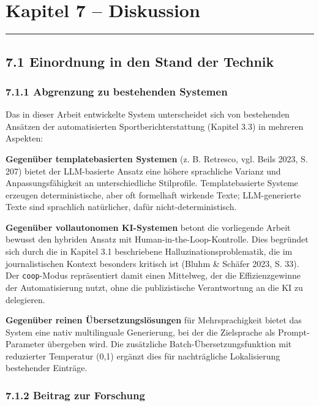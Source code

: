 \section{Kapitel 7 -- Diskussion}\label{kapitel-7-diskussion}

\begin{center}\rule{0.5\linewidth}{0.5pt}\end{center}

\subsection{7.1 Einordnung in den Stand der
Technik}\label{einordnung-in-den-stand-der-technik}

\subsubsection{7.1.1 Abgrenzung zu bestehenden
Systemen}\label{abgrenzung-zu-bestehenden-systemen}

Das in dieser Arbeit entwickelte System unterscheidet sich von
bestehenden Ansätzen der automatisierten Sportberichterstattung (Kapitel
3.3) in mehreren Aspekten:

\textbf{Gegenüber templatebasierten Systemen} (z. B. Retresco, vgl.
Beils 2023, S. 207) bietet der LLM-basierte Ansatz eine höhere
sprachliche Varianz und Anpassungsfähigkeit an unterschiedliche
Stilprofile. Templatebasierte Systeme erzeugen deterministische, aber
oft formelhaft wirkende Texte; LLM-generierte Texte sind sprachlich
natürlicher, dafür nicht-deterministisch.

\textbf{Gegenüber vollautonomen KI-Systemen} betont die vorliegende
Arbeit bewusst den hybriden Ansatz mit Human-in-the-Loop-Kontrolle. Dies
begründet sich durch die in Kapitel 3.1 beschriebene
Halluzinationsproblematik, die im journalistischen Kontext besonders
kritisch ist (Bluhm \& Schäfer 2023, S. 33). Der
\passthrough{\lstinline!coop!}-Modus repräsentiert damit einen
Mittelweg, der die Effizienzgewinne der Automatisierung nutzt, ohne die
publizistische Verantwortung an die KI zu delegieren.

\textbf{Gegenüber reinen Übersetzungslösungen} für Mehrsprachigkeit
bietet das System eine nativ multilinguale Generierung, bei der die
Zielsprache als Prompt-Parameter übergeben wird. Die zusätzliche
Batch-Übersetzungsfunktion mit reduzierter Temperatur (0,1) ergänzt dies
für nachträgliche Lokalisierung bestehender Einträge.

\subsubsection{7.1.2 Beitrag zur Forschung}\label{beitrag-zur-forschung}

